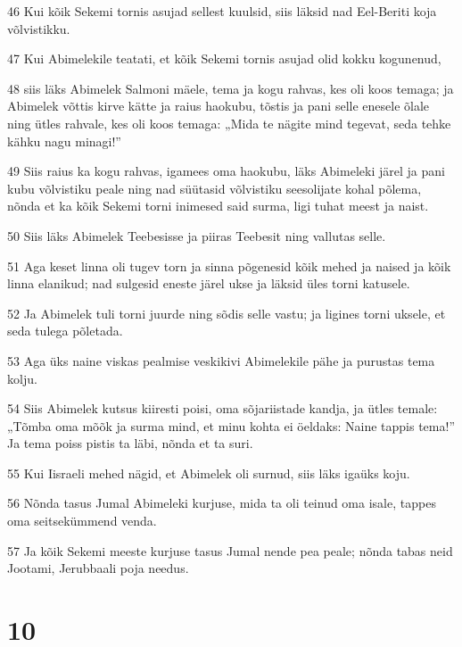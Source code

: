 \par 46 Kui kõik Sekemi tornis asujad sellest kuulsid, siis läksid nad Eel-Beriti koja võlvistikku.
\par 47 Kui Abimelekile teatati, et kõik Sekemi tornis asujad olid kokku kogunenud,
\par 48 siis läks Abimelek Salmoni mäele, tema ja kogu rahvas, kes oli koos temaga; ja Abimelek võttis kirve kätte ja raius haokubu, tõstis ja pani selle enesele õlale ning ütles rahvale, kes oli koos temaga: „Mida te nägite mind tegevat, seda tehke kähku nagu minagi!”
\par 49 Siis raius ka kogu rahvas, igamees oma haokubu, läks Abimeleki järel ja pani kubu võlvistiku peale ning nad süütasid võlvistiku seesolijate kohal põlema, nõnda et ka kõik Sekemi torni inimesed said surma, ligi tuhat meest ja naist.
\par 50 Siis läks Abimelek Teebesisse ja piiras Teebesit ning vallutas selle.
\par 51 Aga keset linna oli tugev torn ja sinna põgenesid kõik mehed ja naised ja kõik linna elanikud; nad sulgesid eneste järel ukse ja läksid üles torni katusele.
\par 52 Ja Abimelek tuli torni juurde ning sõdis selle vastu; ja ligines torni uksele, et seda tulega põletada.
\par 53 Aga üks naine viskas pealmise veskikivi Abimelekile pähe ja purustas tema kolju.
\par 54 Siis Abimelek kutsus kiiresti poisi, oma sõjariistade kandja, ja ütles temale: „Tõmba oma mõõk ja surma mind, et minu kohta ei öeldaks: Naine tappis tema!” Ja tema poiss pistis ta läbi, nõnda et ta suri.
\par 55 Kui Iisraeli mehed nägid, et Abimelek oli surnud, siis läks igaüks koju.
\par 56 Nõnda tasus Jumal Abimeleki kurjuse, mida ta oli teinud oma isale, tappes oma seitsekümmend venda.
\par 57 Ja kõik Sekemi meeste kurjuse tasus Jumal nende pea peale; nõnda tabas neid Jootami, Jerubbaali poja needus.

\chapter{10}

